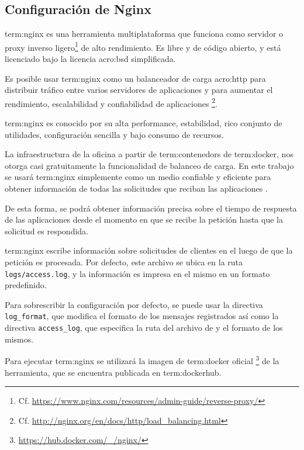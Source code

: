 \subsection{Configuración de Nginx}
\label{configuracion_de_nginx}

\gls{term:nginx} es una herramienta multiplataforma que funciona como servidor
 o proxy inverso ligero\footnote{Cf.
\url{https://www.nginx.com/resources/admin-guide/reverse-proxy/}} de alto
rendimiento. Es  libre y de código abierto, y está licenciado bajo
la licencia \gls{acro:bsd} simplificada.

Es posible usar \gls{term:nginx} como un balanceador de carga \gls{acro:http}
para distribuir tráfico entre varios servidores de aplicaciones y para aumentar
el rendimiento, escalabilidad y confiabilidad de aplicaciones 
\footnote{Cf. \url{http://nginx.org/en/docs/http/load_balancing.html}}.

\gls{term:nginx} es conocido por su alta performance, estabilidad, rico
conjunto de utilidades, configuración sencilla y bajo consumo de recursos.

La infraestructura de la oficina a partir de \glspl{term:contenedor} de
\gls{term:docker}, nos otorga casi gratuitamente la funcionalidad de balanceo de
carga. En este trabajo se usará \gls{term:nginx} simplemente como un medio
confiable y eficiente para obtener información de todas las solicitudes que
reciban las aplicaciones .

De esta forma, se podrá obtener información precisa sobre el tiempo de
respuesta de las aplicaciones desde el momento en que se recibe la petición
hasta que la solicitud es respondida.

\gls{term:nginx} escribe información sobre solicitudes de clientes en el
\texttt{} luego de que la petición  es procesada.
Por defecto, este archivo se ubica en la ruta \texttt{logs/access.log}, y la
información es impresa en el mismo en un formato predefinido.

Para sobrescribir la configuración por defecto, se puede usar la directiva
\texttt{log\_format}, que modifica el formato de los mensajes registrados así
como la directiva \texttt{access\_log}, que especifica la ruta del archivo de
 y el formato de los mismos.

Para ejecutar \gls{term:nginx} se utilizará la imagen de \gls{term:docker}
oficial \footnote{\url{https://hub.docker.com/_/nginx/}} de la herramienta, que
se encuentra publicada en \gls{term:dockerhub}.

